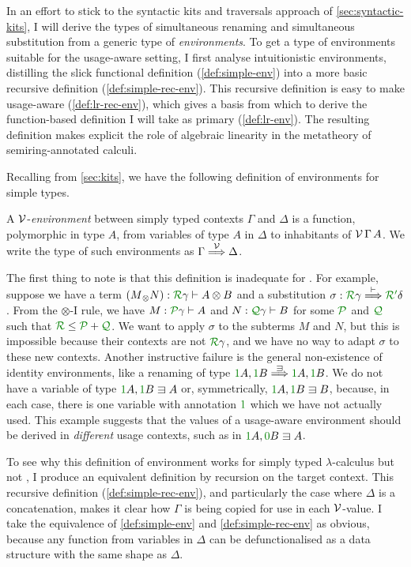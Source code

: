 In an effort to stick to the syntactic kits and traversals approach of
\cref{sec:syntactic-kits}, I will derive the types of simultaneous renaming
and simultaneous substitution from a generic type of \emph{environments}.
To get a type of environments suitable for the usage-aware setting, I first
analyse intuitionistic environments, distilling the slick functional definition
(\cref{def:simple-env}) into a more basic recursive definition
(\cref{def:simple-rec-env}).
This recursive definition is easy to make usage-aware (\cref{def:lr-rec-env}),
which gives a basis from which to derive the function-based definition I will
take as primary (\cref{def:lr-env}).
The resulting definition makes explicit the role of algebraic linearity in the
metatheory of semiring-annotated calculi.

Recalling from \cref{sec:kits}, we have the following definition of
environments for simple types.

\begin{definition}\label{def:simple-env}
  A $\mathcal V$-\emph{environment} between simply typed contexts $\Gamma$ and $\Delta$
  is a function, polymorphic in type $A$, from variables of type $A$ in
  $\Delta$ to inhabitants of $\mathcal V\,\Gamma\,A$.
  We write the type of such environments as $\Gamma \stackrel{\mathcal V}\Longrightarrow \Delta$.
\end{definition}

The first thing to note is that this definition is inadequate for \name{}.
For example, suppose we have a term
$\plr{M{_\otimes}N} : \grR\gamma \vdash A \otimes B$ and a substitution
$\sigma : \grR\gamma \env\vdash \grR\gr'\delta$.
From the $\otimes$-I rule, we have $M : \grP\gamma \vdash A$ and
$N : \grQ\gamma \vdash B$ for some $\grP$ and $\grQ$ such that
$\grR \leq \grP + \grQ$.
We want to apply $\sigma$ to the subterms $M$ and $N$, but this is impossible
because their contexts are not $\grR\gamma$, and we have no way to adapt
$\sigma$ to these new contexts.
Another instructive failure is the general non-existence of identity
environments, like a renaming of type $\gr1A, \gr1B \env\sqni \gr1A, \gr1B$.
We do not have a variable of type $\gr1A, \gr1B \sqni A$ or, symmetrically,
$\gr1A, \gr1B \sqni B$, because, in each case, there is one variable with
annotation $\gr1$ which we have not actually used.
This example suggests that the values of a usage-aware environment should be
derived in \emph{different} usage contexts, such as in $\gr1A, \gr0B \sqni A$.

To see why this definition of environment works for simply typed
$\lambda$-calculus but not \name{}, I produce an equivalent definition by
recursion on the target context.
This recursive definition (\cref{def:simple-rec-env}), and particularly the
case where $\Delta$ is a concatenation, makes it clear how $\Gamma$ is being
copied for use in each $\mathcal V$-value.
I take the equivalence of \cref{def:simple-env} and \cref{def:simple-rec-env}
as obvious, because any function from variables in $\Delta$ can be
defunctionalised as a data structure with the same shape as $\Delta$.

